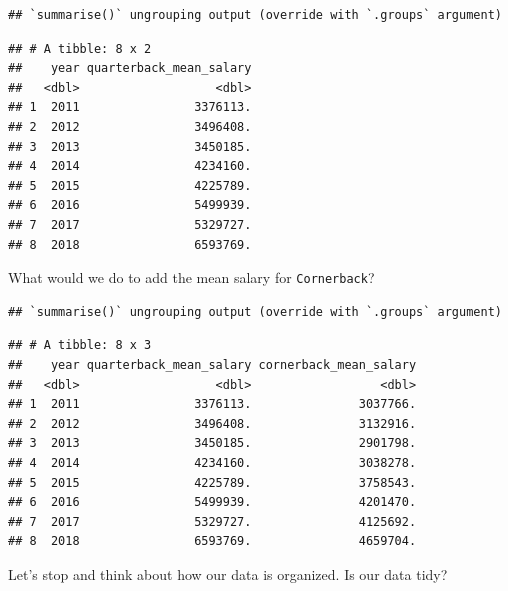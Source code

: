 \documentclass[
]{book}
\newenvironment{Shaded}{\begin{snugshade}}{\end{snugshade}}
\newcommand{\DataTypeTok}[1]{\textcolor[rgb]{0.13,0.29,0.53}{#1}}
\newcommand{\KeywordTok}[1]{\textcolor[rgb]{0.13,0.29,0.53}{\textbf{#1}}}
\newcommand{\NormalTok}[1]{#1}
\newcommand{\OperatorTok}[1]{\textcolor[rgb]{0.81,0.36,0.00}{\textbf{#1}}}
\newcommand{\OtherTok}[1]{\textcolor[rgb]{0.56,0.35,0.01}{#1}}
\newcommand{\StringTok}[1]{\textcolor[rgb]{0.31,0.60,0.02}{#1}}
\begin{document}
\begin{verbatim}
## `summarise()` ungrouping output (override with `.groups` argument)
\end{verbatim}

\begin{verbatim}
## # A tibble: 8 x 2
##    year quarterback_mean_salary
##   <dbl>                   <dbl>
## 1  2011                3376113.
## 2  2012                3496408.
## 3  2013                3450185.
## 4  2014                4234160.
## 5  2015                4225789.
## 6  2016                5499939.
## 7  2017                5329727.
## 8  2018                6593769.
\end{verbatim}

What would we do to add the mean salary for \texttt{Cornerback}?

\begin{Shaded}
\end{Shaded}

\begin{verbatim}
## `summarise()` ungrouping output (override with `.groups` argument)
\end{verbatim}

\begin{verbatim}
## # A tibble: 8 x 3
##    year quarterback_mean_salary cornerback_mean_salary
##   <dbl>                   <dbl>                  <dbl>
## 1  2011                3376113.               3037766.
## 2  2012                3496408.               3132916.
## 3  2013                3450185.               2901798.
## 4  2014                4234160.               3038278.
## 5  2015                4225789.               3758543.
## 6  2016                5499939.               4201470.
## 7  2017                5329727.               4125692.
## 8  2018                6593769.               4659704.
\end{verbatim}

Let's stop and think about how our data is organized. Is our data tidy?
\end{document}
